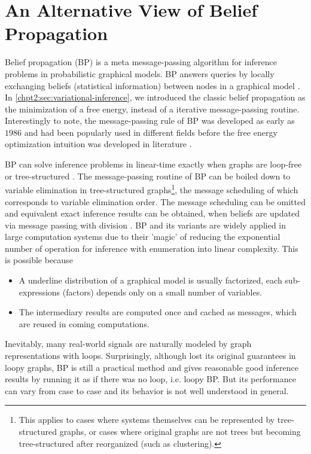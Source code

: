 \chapter{An Alternative View of Belief Propagation}
\label{chapter3}
\graphicspath{{source/chapter3/}}

Belief propagation (BP) is a meta message-passing algorithm for inference problems in probabilistic graphical models. BP answers queries by locally exchanging beliefs (statistical information) between nodes in a graphical model \cite{kschischang2001factor_graph, Bishop:2006:PRM:1162264}. In \autoref{chpt2:sec:variational-inference}, we introduced the classic belief propagation as the minimization of a free energy, instead of a iterative message-passing routine. Interestingly to note, the message-passing rule of BP was developed as early as $1986$ \cite{pearl1986b} and had been popularly used in different fields before the free energy optimization intuition was developed in literature \cite{yedidia2003understanding}.

BP can solve inference problems in linear-time exactly when graphs are loop-free or tree-structured \cite{kschischang2001factor_graph}. The message-passing routine of BP can be boiled down to variable elimination in tree-structured graphs\footnote{This applies to cases where systems themselves can be represented by tree-structured graphs, or cases where original graphs are not trees but becoming tree-structured after reorganized (such as clustering).}, the message scheduling of which corresponds to variable elimination order. The message scheduling can be omitted and equivalent exact inference results can be obtained, when beliefs are updated via message passing with division \cite[section~10.3]{koller2009pgm}. BP and its variants are widely applied in large computation systems due to their 'magic' of reducing the exponential number of operation for inference with enumeration into linear complexity. This is possible because 
\begin{itemize}
\item A underline distribution of a graphical model is usually factorized, each sub-expressions (factors) depends only on a small number of variables.
\item The intermediary results are computed once and cached as messages, which are reused in coming computations. 
\end{itemize}

Inevitably, many real-world signals are naturally modeled by graph representations with loops. Surprisingly, although lost its original guarantees in loopy graphs, BP is still a practical method and gives reasonable good inference results by running it as if there was no loop, i.e. loopy BP. But its performance can vary from case to case and its behavior is not well understood in general. 

